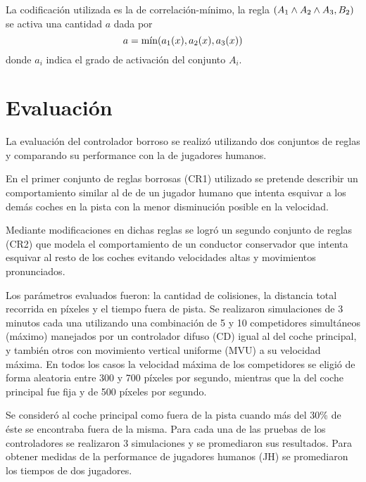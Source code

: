 \documentclass[conference,spanish,a4paper,10pt,oneside,final]{tfmpd}
\begin{document}
La codificación utilizada es la de correlación-mínimo, la regla $(A_1\wedge A_2\wedge A_3,B_2)$
se activa una cantidad $a$ dada por
\begin{equation}
a=\textrm{mín}(a_1(x),a_2(x),a_3(x))
\end{equation}
donde $a_i$ indica el grado de activación del conjunto $A_i$. 
%
%
%
%
\section{Evaluación}
La evaluación del controlador borroso se realizó utilizando dos conjuntos de reglas
y comparando su performance con la de jugadores humanos.

En el primer conjunto de reglas borrosas (CR1) utilizado se pretende describir un comportamiento similar al de
de un jugador humano que intenta esquivar a los demás coches en la pista con la menor
disminución posible en la velocidad. 

Mediante modificaciones en dichas reglas se logró un segundo conjunto de
reglas (CR2) que modela el comportamiento de un conductor conservador que intenta
esquivar al resto de los coches evitando velocidades altas y movimientos pronunciados. 

Los parámetros evaluados fueron: la cantidad de colisiones, la distancia total recorrida en píxeles 
y el tiempo fuera de pista.
Se realizaron simulaciones de 3 minutos cada una utilizando una combinación de 5 y 10 competidores
simultáneos (máximo) manejados por un controlador difuso (CD) igual al del coche principal, y también otros con movimiento 
vertical uniforme (MVU) a su velocidad máxima. En todos los casos la velocidad máxima
de los competidores se eligió de forma aleatoria
entre 300 y 700 píxeles por segundo, mientras que la del coche principal fue fija
y de 500 píxeles por segundo.


Se consideró al coche principal como fuera de la pista cuando más del 30\% de éste se encontraba fuera de la misma.
%
Para cada una de las pruebas de los controladores se realizaron 3 simulaciones y se promediaron sus resultados.
Para obtener medidas de la performance de jugadores humanos (JH) se promediaron los tiempos
de dos jugadores.
\end{document}
